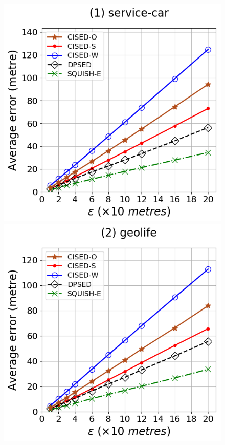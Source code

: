 \begin{figure}[tb]
	\centering
	\includegraphics[scale = 0.30]{Figures/Exp-error-epsilon-service.png}
	\includegraphics[scale = 0.30]{Figures/Exp-error-epsilon-geolife.png}

\end{figure}
